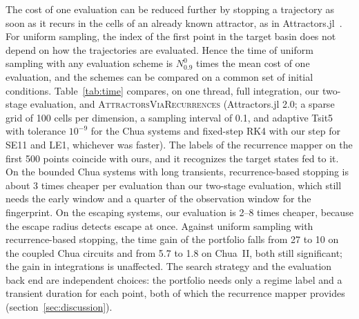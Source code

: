 The cost of one evaluation can be reduced further by stopping a trajectory as soon as it recurs in the cells of an already known attractor, as in Attractors.jl~\cite{DatserisWagemakers2022,Datseris2023Framework}. For uniform sampling, the index of the first point in the target basin does not depend on how the trajectories are evaluated. Hence the time of uniform sampling with any evaluation scheme is $N^0_{0.9}$ times the mean cost of one evaluation, and the schemes can be compared on a common set of initial conditions. Table~\ref{tab:time} compares, on one thread, full integration, our two-stage evaluation, and \textsc{AttractorsViaRecurrences} (Attractors.jl 2.0; a sparse grid of 100 cells per dimension, a sampling interval of 0.1, and adaptive Tsit5 with tolerance $10^{-9}$ for the Chua systems and fixed-step RK4 with our step for SE11 and LE1, whichever was faster). The labels of the recurrence mapper on the first 500 points coincide with ours, and it recognizes the target states fed to it. On the bounded Chua systems with long transients, recurrence-based stopping is about 3 times cheaper per evaluation than our two-stage evaluation, which still needs the early window and a quarter of the observation window for the fingerprint. On the escaping systems, our evaluation is 2--8 times cheaper, because the escape radius detects escape at once. Against uniform sampling with recurrence-based stopping, the time gain of the portfolio falls from 27 to 10 on the coupled Chua circuits and from 5.7 to 1.8 on Chua~II, both still significant; the gain in integrations is unaffected. The search strategy and the evaluation back end are independent choices: the portfolio needs only a regime label and a transient duration for each point, both of which the recurrence mapper provides (section~\ref{sec:discussion}).

